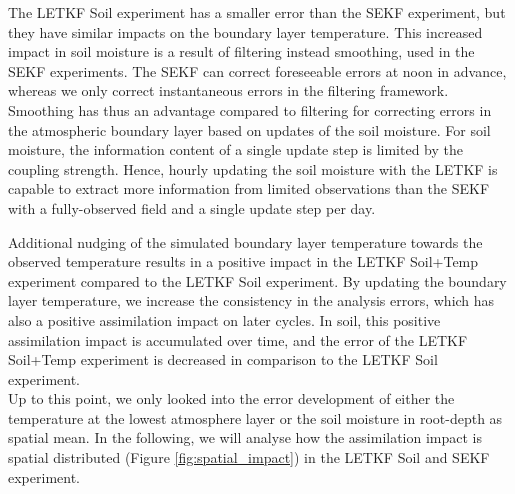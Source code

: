 \documentclass[hess, manuscript]{copernicus}
\begin{document}
The LETKF Soil experiment has a smaller error than the SEKF experiment, but they have similar impacts on the boundary layer temperature.
This increased impact in soil moisture is a result of filtering instead smoothing, used in the SEKF experiments.
The SEKF can correct foreseeable errors at noon in advance, whereas we only correct instantaneous errors in the filtering framework.
Smoothing has thus an advantage compared to filtering for correcting errors in the atmospheric boundary layer based on updates of the soil moisture.
For soil moisture, the information content of a single update step is limited by the coupling strength.
Hence, hourly updating the soil moisture with the LETKF is capable to extract more information from limited observations than the SEKF with a fully-observed field and a single update step per day.

Additional nudging of the simulated boundary layer temperature towards the observed temperature results in a positive impact in the LETKF Soil+Temp experiment compared to the LETKF Soil experiment.
By updating the boundary layer temperature, we increase the consistency in the analysis errors, which has also a positive assimilation impact on later cycles.
In soil, this positive assimilation impact is accumulated over time, and the error of the LETKF Soil+Temp experiment is decreased in comparison to the LETKF Soil experiment.\\

Up to this point, we only looked into the error development of either the temperature at the lowest atmosphere layer or the soil moisture in root-depth as spatial mean.
In the following, we will analyse how the assimilation impact is spatial distributed (Figure \ref{fig:spatial_impact}) in the LETKF Soil and SEKF experiment.
\end{document}
